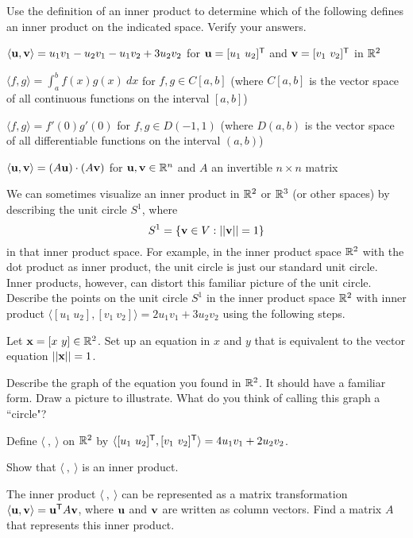 \item \label{ex:6_c_inner_products} Use the definition of an inner product to determine which of the following defines an inner product on the indicated space. Verify your answers.
    \ba

    \item $\langle \mathbf{u}, \mathbf{v} \rangle = u_1v_1 - u_2v_1 - u_1v_2 + 3u_2v_2$ for $\vu = [u_1 \ u_2]^{\tr}$ and $\vv = [v_1 \ v_2]^{\tr}$ in $\mathbb{R}^2$

    \item $\langle f, g \rangle = \int_a^b f(x)g(x) \ dx$ for $f,g \in C[a,b]$ (where $C[a,b]$ is the vector space of all continuous functions on the interval $[a,b]$)

	
	\item $\langle f, g \rangle = f'(0)g'(0)$ for $f,g \in D(-1,1)$ (where $D(a,b)$ is the vector space of all differentiable functions on the interval $(a,b)$)
	
	
	
	\item $\langle \mathbf{u}, \mathbf{v} \rangle = (A\mathbf{u}) \cdot (A\mathbf{v})$ for $\mathbf{u}, \mathbf{v} \in \mathbb{R}^n$ and $A$ an invertible $n \times n$ matrix
	
	
	

    \ea


\item We can sometimes visualize an inner product in $\mathbb{R}^2$ or $\mathbb{R}^3$ (or other spaces) by describing the unit circle $S^1$, where
\[S^1 = \{ \mathbf{v} \in V : || \mathbf{v} || = 1\}\]
in that inner product space. For example, in the inner product space $\mathbb{R}^2$ with the dot product as inner product, the unit circle is just our standard unit circle. Inner products, however, can distort this familiar picture of the unit circle.  Describe the points on the unit circle $S^1$ in the inner product space $\mathbb{R}^2$ with inner product $\langle [u_1 \ u_2], [v_1 \ v_2] \rangle = 2u_1v_1 + 3u_2v_2$ using the following steps.
	\ba
	\item Let $\mathbf{x} = [x \ y] \in \mathbb{R}^2$. Set up an equation in $x$ and $y$ that is equivalent to the vector equation $|| \mathbf{x} || = 1$.
	
	
	
	\item Describe the graph of the equation you found in $\mathbb{R}^2$. It should have a familiar form. Draw a picture to illustrate. What do you think of calling this graph a ``circle"?
	
	
	
	\ea
	

\item \label{ex:6_c_ip_1} Define $\langle \ ,  \ \rangle$ on $\mathbb{R}^2$ by $\langle [u_1 \ u_2]^{\mathsf{T}} , [v_1 \ v_2]^{\mathsf{T}} \rangle = 4u_1v_1+2u_2v_2$.	
	\ba
	\item Show that $\langle \ ,  \ \rangle$ is an inner product.
	\item The inner product $\langle \ ,  \ \rangle$ can be represented as a matrix transformation $\langle \mathbf{u}, \mathbf{v} \rangle = \mathbf{u}^{\mathsf{T}} A \mathbf{v}$, where $\mathbf{u}$ and $\mathbf{v}$ are written as column vectors. Find a matrix $A$ that represents this inner product. 
	\ea


